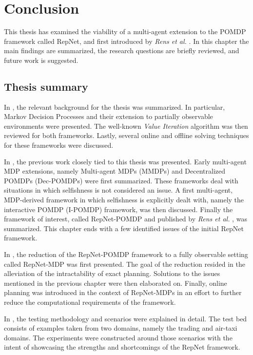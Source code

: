\chapter{Conclusion}
\label{chap:conclusion}
This thesis has examined the viability of a multi-agent extension to the POMDP framework called RepNet, and first introduced by \textit{Rens et al.} \cite{rensetal}. In this chapter the main findings are summarized, the research questions are briefly reviewed, and future work is suggested.
\section{Thesis summary}
In , the relevant background for the thesis was summarized. In particular, Markov Decision Processes and their extension to partially observable environments were presented. The well-known \textit{Value Iteration} algorithm was then reviewed for both frameworks. Lastly, several online and offline solving techniques for these frameworks were discussed.

In , the previous work closely tied to this thesis was presented. Early multi-agent MDP extensions, namely Multi-agent MDPs (MMDPs) and Decentralized POMDPs (Dec-POMDPs) were first summarized. These frameworks deal with situations in which selfishness is not considered an issue. A first multi-agent, MDP-derived framework in which selfishness is explicitly dealt with, namely the interactive POMDP (I-POMDP) framework, was then discussed. Finally the framework of interest, called RepNet-POMDP and published by \textit{Rens et al.} \cite{rensetal}, was summarized. This chapter ends with a few identified issues of the initial RepNet framework.

In , the reduction of the RepNet-POMDP framework to a fully observable setting called RepNet-MDP was first presented. The goal of the reduction resided in the alleviation of the intractability of exact planning. Solutions to the issues mentioned in the previous chapter were then elaborated on. Finally, online planning was introduced in the context of RepNet-MDPs in an effort to further reduce the computational requirements of the framework.

In , the testing methodology and scenarios were explained in detail. The test bed consists of examples taken from two domains, namely the trading and air-taxi domains. The experiments were constructed around those scenarios with the intent of showcasing the strengths and shortcomings of the RepNet framework. 


